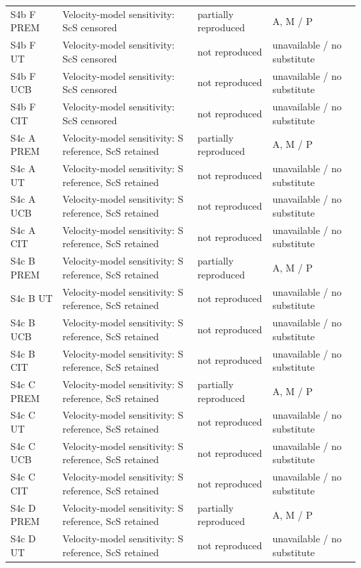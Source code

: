 \documentclass[10pt]{article}
\begin{document}
\begin{longtable}{p{.23\linewidth}p{.25\linewidth}p{.19\linewidth}p{.22\linewidth}}
S4b F PREM & Velocity-model sensitivity: ScS censored & partially reproduced & A, M / P \\
S4b F UT & Velocity-model sensitivity: ScS censored & not reproduced & unavailable / no substitute \\
S4b F UCB & Velocity-model sensitivity: ScS censored & not reproduced & unavailable / no substitute \\
S4b F CIT & Velocity-model sensitivity: ScS censored & not reproduced & unavailable / no substitute \\
S4c A PREM & Velocity-model sensitivity: S reference, ScS retained & partially reproduced & A, M / P \\
S4c A UT & Velocity-model sensitivity: S reference, ScS retained & not reproduced & unavailable / no substitute \\
S4c A UCB & Velocity-model sensitivity: S reference, ScS retained & not reproduced & unavailable / no substitute \\
S4c A CIT & Velocity-model sensitivity: S reference, ScS retained & not reproduced & unavailable / no substitute \\
S4c B PREM & Velocity-model sensitivity: S reference, ScS retained & partially reproduced & A, M / P \\
S4c B UT & Velocity-model sensitivity: S reference, ScS retained & not reproduced & unavailable / no substitute \\
S4c B UCB & Velocity-model sensitivity: S reference, ScS retained & not reproduced & unavailable / no substitute \\
S4c B CIT & Velocity-model sensitivity: S reference, ScS retained & not reproduced & unavailable / no substitute \\
S4c C PREM & Velocity-model sensitivity: S reference, ScS retained & partially reproduced & A, M / P \\
S4c C UT & Velocity-model sensitivity: S reference, ScS retained & not reproduced & unavailable / no substitute \\
S4c C UCB & Velocity-model sensitivity: S reference, ScS retained & not reproduced & unavailable / no substitute \\
S4c C CIT & Velocity-model sensitivity: S reference, ScS retained & not reproduced & unavailable / no substitute \\
S4c D PREM & Velocity-model sensitivity: S reference, ScS retained & partially reproduced & A, M / P \\
S4c D UT & Velocity-model sensitivity: S reference, ScS retained & not reproduced & unavailable / no substitute \\

\end{longtable}
\end{document}

